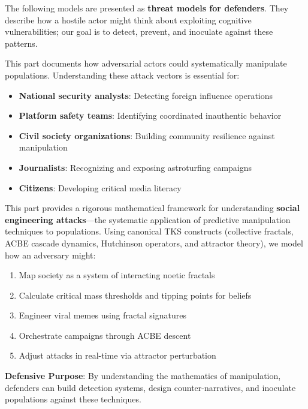 \documentclass[11pt,twoside]{book}
\theoremstyle{definition}
\theoremstyle{plain}
\theoremstyle{remark}
\begin{document}
\begin{tcolorbox}[colback=red!5!white,colframe=red!75!black,title=\textbf{THREAT MODEL NOTICE},breakable]
The following models are presented as \textbf{threat models for defenders}. They describe how a hostile actor might think about exploiting cognitive vulnerabilities; our goal is to detect, prevent, and inoculate against these patterns.

This part documents how adversarial actors could systematically manipulate populations. Understanding these attack vectors is essential for:
\begin{itemize}
    \item \textbf{National security analysts}: Detecting foreign influence operations
    \item \textbf{Platform safety teams}: Identifying coordinated inauthentic behavior
    \item \textbf{Civil society organizations}: Building community resilience against manipulation
    \item \textbf{Journalists}: Recognizing and exposing astroturfing campaigns
    \item \textbf{Citizens}: Developing critical media literacy
\end{itemize}
\end{tcolorbox}

\begin{tcolorbox}[colback=blue!5!white,colframe=blue!75!black,title=\textbf{Part Overview},breakable]
This part provides a rigorous mathematical framework for understanding \textbf{social engineering attacks}---the systematic application of predictive manipulation techniques to populations. Using canonical TKS constructs (collective fractals, ACBE cascade dynamics, Hutchinson operators, and attractor theory), we model how an adversary might:
\begin{enumerate}
    \item Map society as a system of interacting noetic fractals
    \item Calculate critical mass thresholds and tipping points for beliefs
    \item Engineer viral memes using fractal signatures
    \item Orchestrate campaigns through ACBE descent
    \item Adjust attacks in real-time via attractor perturbation
\end{enumerate}
\textbf{Defensive Purpose}: By understanding the mathematics of manipulation, defenders can build detection systems, design counter-narratives, and inoculate populations against these techniques.
\end{tcolorbox}
\end{document}
